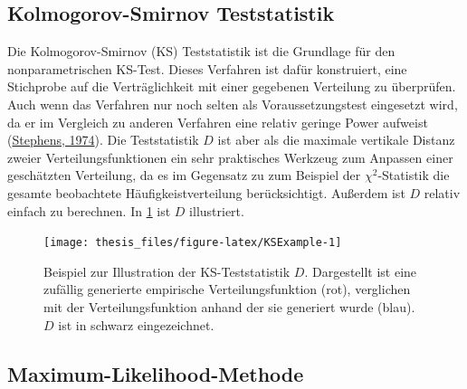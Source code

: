 \documentclass[
  12pt,
]{book}
\begin{document}
\hypertarget{kolmogorov-smirnov-teststatistik}{%
\subsection{Kolmogorov-Smirnov Teststatistik}\label{kolmogorov-smirnov-teststatistik}}

Die Kolmogorov-Smirnov (KS) Teststatistik ist die Grundlage für den nonparametrischen KS-Test. Dieses Verfahren ist dafür konstruiert, eine Stichprobe auf die Verträglichkeit mit einer gegebenen Verteilung zu überprüfen. Auch wenn das Verfahren nur noch selten als Voraussetzungstest eingesetzt wird, da er im Vergleich zu anderen Verfahren eine relativ geringe Power aufweist (\protect\hyperlink{ref-stephensEDFStatisticsGoodness1974}{Stephens, 1974}).
Die Teststatistik \(D\) ist aber als die maximale vertikale Distanz zweier Verteilungsfunktionen ein sehr praktisches Werkzeug zum Anpassen einer geschätzten Verteilung, da es im Gegensatz zu zum Beispiel der \(\chi^2\)-Statistik die gesamte beobachtete Häufigkeistverteilung berücksichtigt. Außerdem ist \(D\) relativ einfach zu berechnen. In \ref{fig:KSExample} ist \(D\) illustriert.





\begin{figure}

{\centering \texttt{[image: thesis\_files/figure-latex/KSExample-1]} 

}

\caption[Beispiel zur Illustration der KS-Teststatistik \(D\).]{Beispiel zur Illustration der KS-Teststatistik \(D\). Dargestellt ist eine zufällig generierte empirische Verteilungsfunktion (rot), verglichen mit der Verteilungsfunktion anhand der sie generiert wurde (blau). \(D\) ist in schwarz eingezeichnet.}\label{fig:KSExample}
\end{figure}

\hypertarget{maximum-likelihood-methode}{%
\subsection{Maximum-Likelihood-Methode}\label{maximum-likelihood-methode}}
\end{document}

